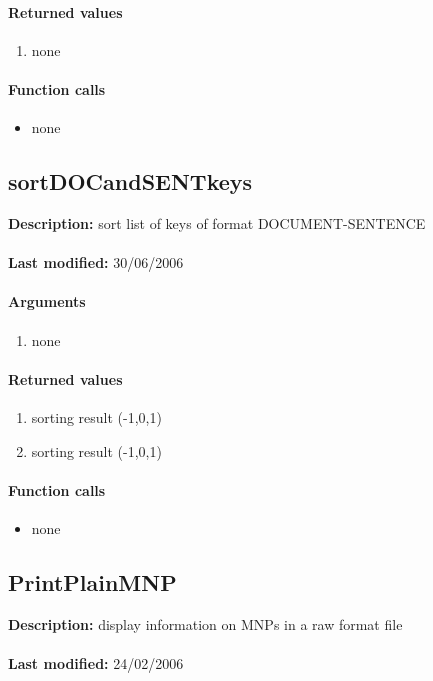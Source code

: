\paragraph{Returned values}
\begin{enumerate}
\item none
\end{enumerate}

\paragraph{Function calls}
\begin{itemize}
\item none
\end{itemize}

\subsection{sortDOCandSENTkeys}
\textbf{Description:} sort list of keys of format DOCUMENT-SENTENCE\\
\\\textbf{Last modified:} 30/06/2006

\paragraph{Arguments}
\begin{enumerate}
\item none
\end{enumerate}

\paragraph{Returned values}
\begin{enumerate}
\item sorting result (-1,0,1)
\item sorting result (-1,0,1)
\end{enumerate}

\paragraph{Function calls}
\begin{itemize}
\item none
\end{itemize}

\subsection{PrintPlainMNP}
\textbf{Description:} display information on MNPs in a raw format file\\
\\\textbf{Last modified:} 24/02/2006

